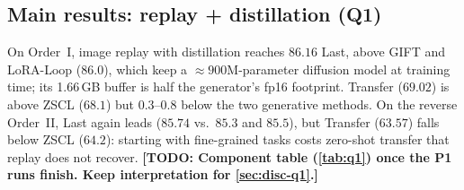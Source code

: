 \documentclass[10pt,twocolumn,letterpaper]{article}
\newcommand{\TODO}[1]{\textbf{\color{red}[TODO: #1]}}
\newcommand{\Q}[1]{\textbf{Q#1}\xspace}     %
\begin{document}
\subsection{Main results: replay + distillation (\Q{1})}
\label{sec:res-q1}
On Order~I, image replay with distillation reaches $86.16$ Last,
above GIFT and LoRA-Loop (86.0), which keep a ${\approx}900$M-parameter
diffusion model at training time; its 1.66\,GB buffer is half the generator's
fp16 footprint. Transfer ($69.02$) is above ZSCL ($68.1$) but $0.3$--$0.8$ below
the two generative methods. On the reverse Order~II, Last again leads
($85.74$ vs.\ $85.3$ and $85.5$), but Transfer ($63.57$) falls below ZSCL
($64.2$): starting with fine-grained tasks costs zero-shot transfer that replay
does not recover. \TODO{Component table (\cref{tab:q1}) once the P1 runs finish. Keep interpretation for \cref{sec:disc-q1}.}
\end{document}
